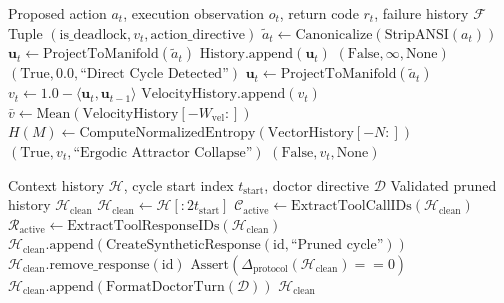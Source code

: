\documentclass[journal]{IEEEtran}
\begin{document}
\begin{algorithm}[!t]
\caption{Continuous Phase-Space Trajectory Inspection}
\label{alg:attractor_detection}
\footnotesize
\raggedright
\begin{algorithmic}[1]
\REQUIRE Proposed action $a_t$, execution observation $o_t$, return code $r_t$, failure history $\mathcal{F}$
\ENSURE Tuple $(\text{is\_deadlock}, v_t, \text{action\_directive})$
\STATE $\tilde{a}_t \leftarrow \text{Canonicalize}(\text{StripANSI}(a_t))$
    \STATE $\mathbf{u}_t \leftarrow \text{ProjectToManifold}(\tilde{a}_t)$
    \STATE $\text{History}.\text{append}(\mathbf{u}_t)$
    \RETURN $(\text{False}, \infty, \text{None})$ 
\ENDIF
{}
    \RETURN $(\text{True}, 0.0, \text{``Direct Cycle Detected''})$ 
\ENDIF
\STATE $\mathbf{u}_t \leftarrow \text{ProjectToManifold}(\tilde{a}_t)$
\STATE $v_t \leftarrow 1.0 - \langle \mathbf{u}_t, \mathbf{u}_{t-1} \rangle$
\STATE $\text{VelocityHistory}.\text{append}(v_t)$
\STATE $\bar{v} \leftarrow \text{Mean}(\text{VelocityHistory}[-W_{\text{vel}}:])$ 
\STATE $H(M) \leftarrow \text{ComputeNormalizedEntropy}(\text{VectorHistory}[-N:])$ 
    \RETURN $(\text{True}, v_t, \text{``Ergodic Attractor Collapse''})$
\ENDIF
\RETURN $(\text{False}, v_t, \text{None})$
\end{algorithmic}
\end{algorithm}

\begin{algorithm}[!t]
\caption{Atomic Prefix-Preserving Rollback and Repair}
\label{alg:atomic_pruning}
\footnotesize
\raggedright
\begin{algorithmic}[1]
\REQUIRE Context history $\mathcal{H}$, cycle start index $t_{\text{start}}$, doctor directive $\mathcal{D}$
\ENSURE Validated pruned history $\mathcal{H}_{\text{clean}}$
\STATE $\mathcal{H}_{\text{clean}} \leftarrow \mathcal{H}[:2 t_{\text{start}}]$ 
\STATE $\mathcal{C}_{\text{active}} \leftarrow \text{ExtractToolCallIDs}(\mathcal{H}_{\text{clean}})$
\STATE $\mathcal{R}_{\text{active}} \leftarrow \text{ExtractToolResponseIDs}(\mathcal{H}_{\text{clean}})$
    \STATE $\mathcal{H}_{\text{clean}}.\text{append}(\text{CreateSyntheticResponse}(\text{id}, \text{``Pruned cycle''}))$
\ENDFOR
{}
    \STATE $\mathcal{H}_{\text{clean}}.\text{remove\_response}(\text{id})$
\ENDFOR
\STATE $\text{Assert}(\Delta_{\text{protocol}}(\mathcal{H}_{\text{clean}}) == 0)$
\STATE $\mathcal{H}_{\text{clean}}.\text{append}(\text{FormatDoctorTurn}(\mathcal{D}))$
\RETURN $\mathcal{H}_{\text{clean}}$
\end{algorithmic}
\end{algorithm}
\end{document}
